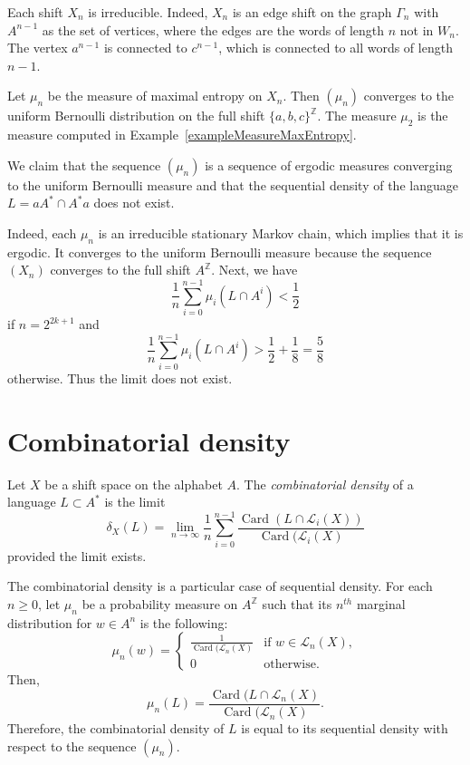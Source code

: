 \documentclass{article}[11pt]
\newcommand\cL{\mathcal{L}}
\newcommand{\Z}{\mathbb{Z}}
\DeclareMathOperator{\Card}{Card}
\numberwithin{theorem}{section}
\numberwithin{equation}{section}
\numberwithin{figure}{section}
\numberwithin{table}{section}
\begin{document}
Each shift $X_n$ is irreducible. 
Indeed, $X_n$ is an edge shift on the graph $\Gamma_n$ with $A^{n-1}$ as the set of vertices, where the edges are the
words of length $n$ not in $W_n$. 
The vertex $a^{n-1}$ is connected to $c^{n-1}$, which is connected to all words of length $n-1$.

Let $\mu_n$ be the measure of maximal entropy on $X_n$. Then $(\mu_n)$ converges to the uniform Bernoulli
distribution on the full shift $\{a,b,c\}^\Z$.
The measure $\mu_2$ is the measure computed in Example~\ref{exampleMeasureMaxEntropy}.

We claim that the sequence $(\mu_n)$ is a sequence of ergodic measures converging to the
uniform Bernoulli measure and that the sequential density of the language $L=aA^*\cap A^*a$ does
not exist.

Indeed, each $\mu_n$ is an irreducible stationary Markov chain, which implies that it is ergodic.
It converges to the uniform Bernoulli measure because the sequence $(X_n)$ converges to
the full shift $A^\Z$. Next, we have
\[\frac{1}{n}\sum_{i=0}^{n-1}\mu_i(L\cap A^i)<\frac{1}{2}
\]
if $n=2^{2k+1}$ and 
\[\frac{1}{n}\sum_{i=0}^{n-1}\mu_i(L\cap A^i)>\frac{1}{2}+\frac{1}{8}=\frac{5}{8}\]
otherwise. Thus the limit does not exist.


\section{Combinatorial density}\label{sectionCombinatorial}
Let $X$ be a shift space on the alphabet $A$. The \emph{combinatorial density}
of a language $L\subset A^*$ is the limit
\[\delta_X(L)=\lim_{n\to\infty}\frac{1}{n}\sum_{i=0}^{n-1}\frac{\Card(L\cap\cL_i(X))}{\Card(\cL_i(X)}\]
provided the limit exists.

The combinatorial density is a particular case of sequential density. 
For each $n\ge 0$, let $\mu_n$ be
a probability measure on $A^\Z$ such that its $n^{th}$ marginal distribution for $w\in A^n$ is the following:
\[\mu_n(w)=\begin{cases}\frac{1}{\Card(\cL_n(X)}&\mbox{if $w\in\cL_n(X)$},\\0&\mbox{otherwise.}\end{cases}\]
Then, 
\[\mu_n(L)=\frac{\Card(L\cap\cL_n(X)}{\Card(\cL_n(X)}.\]
Therefore, the combinatorial density of $L$ is equal to its sequential density with respect to
the sequence $(\mu_n)$.
\end{document}
